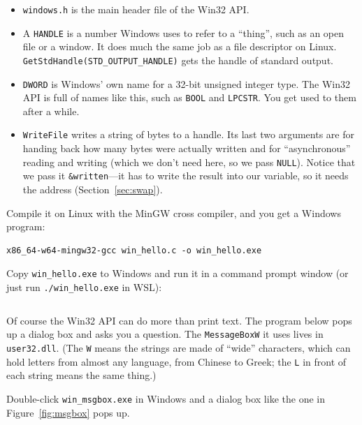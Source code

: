 \begin{itemize}
  \item \texttt{windows.h} is the main header file of the Win32 API.
  \item A \texttt{HANDLE} is a number Windows uses to refer to a ``thing'', such as an open file or a window. It does much the same job as a file descriptor on Linux. \texttt{GetStdHandle(STD\_OUTPUT\_HANDLE)} gets the handle of standard output.
  \item \texttt{DWORD} is Windows' own name for a 32-bit unsigned integer type. The Win32 API is full of names like this, such as \texttt{BOOL} and \texttt{LPCSTR}. You get used to them after a while.
  \item \texttt{WriteFile} writes a string of bytes to a handle. Its last two arguments are for handing back how many bytes were actually written and for ``asynchronous'' reading and writing (which we don't need here, so we pass \texttt{NULL}). Notice that we pass it \texttt{\&written}---it has to write the result into our variable, so it needs the address (Section~\ref{sec:swap}).
\end{itemize}

Compile it on Linux with the MinGW cross compiler, and you get a Windows program:
\begin{verbatim}
x86_64-w64-mingw32-gcc win_hello.c -o win_hello.exe
\end{verbatim}
Copy \texttt{win\_hello.exe} to Windows and run it in a command prompt window (or just run \texttt{./win\_hello.exe} in WSL):
\inputminted[linenos=false]{text}{code/en/ch05/out/win_hello.txt}

Of course the Win32 API can do more than print text. The program below pops up a dialog box and asks you a question. The \texttt{MessageBoxW} it uses lives in \texttt{user32.dll}. (The \texttt{W} means the strings are made of ``wide'' characters, which can hold letters from almost any language, from Chinese to Greek; the \texttt{L} in front of each string means the same thing.)


Double-click \texttt{win\_msgbox.exe} in Windows and a dialog box like the one in Figure~\ref{fig:msgbox} pops up.

